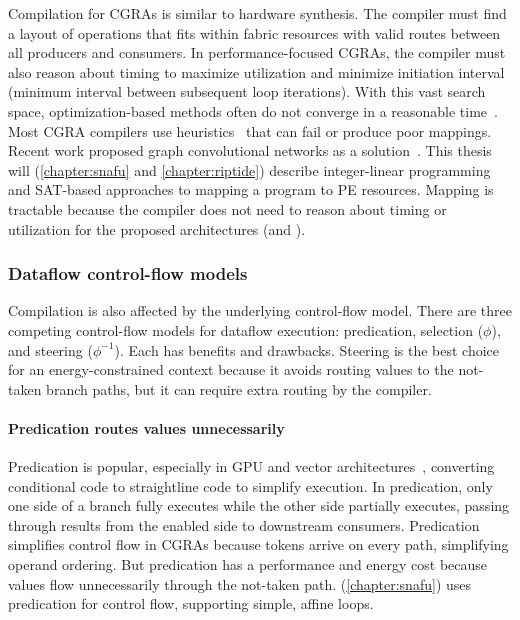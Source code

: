 Compilation for CGRAs is similar to hardware synthesis.
% 
The compiler must find a layout of
operations that fits within fabric resources with valid routes between
all producers and consumers.
%
In performance-focused CGRAs, the compiler must also reason
about timing to maximize utilization and minimize
initiation interval (minimum interval between subsequent loop iterations).
%
With this vast search space, optimization-based methods often
do not converge in a reasonable time~\cite{hybrid-sched,nowatzki2013general}.
%
Most CGRA compilers use heuristics~\cite{opencgra,revamp,park2008edge,mei2002dresc,dora,nowatzki2013general,hybrid-sched,weng2020dsagen} that can 
fail or produce poor mappings.
%
Recent work proposed graph convolutional networks as a
solution~\cite{mirhoseini2020chip}.
% 
This thesis will (\autoref{chapter:snafu} and \autoref{chapter:riptide}) describe integer-linear programming and SAT-based approaches to mapping a program to PE resources.
% 
Mapping is tractable because the compiler does not need to reason about timing or
utilization for the proposed architectures (\snafu and \riptide).

\subsubsection{Dataflow control-flow models}
Compilation is also affected by the underlying control-flow model.
% 
There are three competing control-flow models for dataflow execution: predication, selection ($\phi$), and steering ($\phi^{-1}$).
% 
Each has benefits and drawbacks. 
% 
Steering is the best choice for an energy-constrained context because it avoids routing values to the not-taken branch paths, but it can require extra routing by the compiler.

\paragraph{Predication routes values unnecessarily}
Predication is popular, especially in GPU and vector
architectures~\cite{avx,hennessy2011computer}, converting conditional code to
straightline code to simplify execution.
% 
In predication, only one side of a branch fully executes while the other side partially executes, passing through results from the enabled side to downstream consumers.
%
Predication simplifies control flow in CGRAs because tokens arrive
on every path, simplifying operand ordering.
%
But predication has a performance and energy cost because values flow
unnecessarily through the not-taken path.
%
\snafu (\autoref{chapter:snafu}) uses predication for control flow, supporting simple, affine loops.

